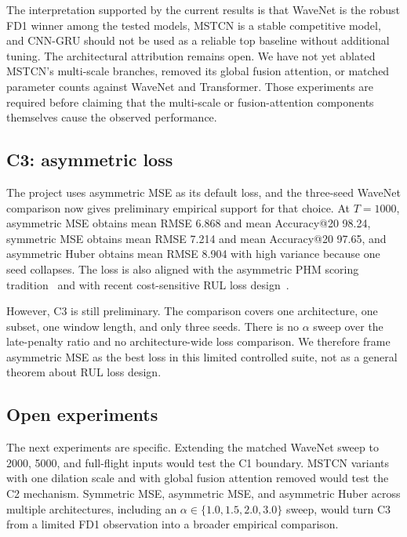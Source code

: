 The interpretation supported by the current results is that WaveNet is the robust FD1 winner among the tested models, MSTCN is a stable competitive model, and CNN-GRU should not be used as a reliable top baseline without additional tuning. The architectural attribution remains open. We have not yet ablated MSTCN's multi-scale branches, removed its global fusion attention, or matched parameter counts against WaveNet and Transformer. Those experiments are required before claiming that the multi-scale or fusion-attention components themselves cause the observed performance.

\subsection{C3: asymmetric loss}

The project uses asymmetric MSE as its default loss, and the three-seed WaveNet comparison now gives preliminary empirical support for that choice. At $T{=}1000$, asymmetric MSE obtains mean RMSE 6.868 and mean Accuracy@20 98.24, symmetric MSE obtains mean RMSE 7.214 and mean Accuracy@20 97.65, and asymmetric Huber obtains mean RMSE 8.904 with high variance because one seed collapses. The loss is also aligned with the asymmetric PHM scoring tradition~\cite{saxena2008damage} and with recent cost-sensitive RUL loss design~\cite{mpm2024loss}.

However, C3 is still preliminary. The comparison covers one architecture, one subset, one window length, and only three seeds. There is no $\alpha$ sweep over the late-penalty ratio and no architecture-wide loss comparison. We therefore frame asymmetric MSE as the best loss in this limited controlled suite, not as a general theorem about RUL loss design.

\subsection{Open experiments}

The next experiments are specific. Extending the matched WaveNet sweep to 2000, 5000, and full-flight inputs would test the C1 boundary. MSTCN variants with one dilation scale and with global fusion attention removed would test the C2 mechanism. Symmetric MSE, asymmetric MSE, and asymmetric Huber across multiple architectures, including an $\alpha \in \{1.0,1.5,2.0,3.0\}$ sweep, would turn C3 from a limited FD1 observation into a broader empirical comparison.
